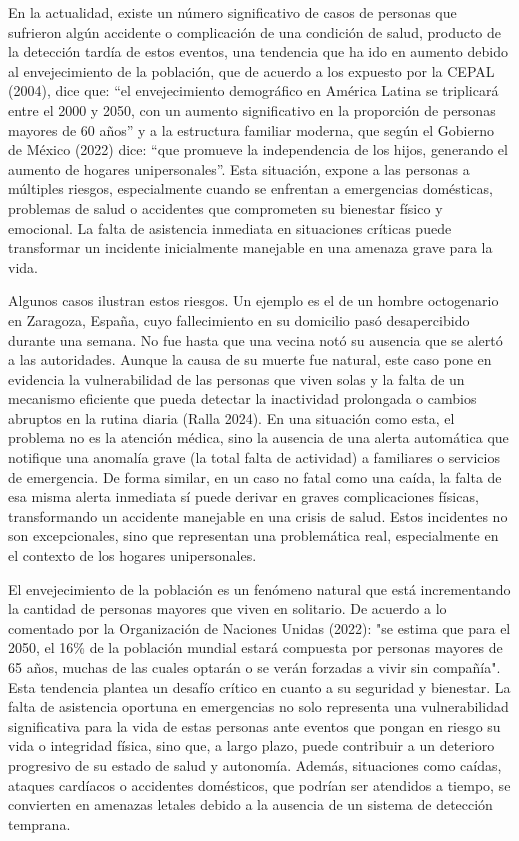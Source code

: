 
En la actualidad, existe un número significativo de casos de personas que sufrieron algún accidente o complicación de una condición de salud, producto de la detección tardía de estos eventos, una tendencia que ha ido en aumento debido al envejecimiento de la población, que de acuerdo a los expuesto por la CEPAL (2004), dice que: “el envejecimiento demográfico en América Latina se triplicará entre el 2000 y 2050, con un aumento significativo en la proporción de personas mayores de 60 años” y a la estructura familiar moderna, que según el Gobierno de México (2022) dice: “que promueve la independencia de los hijos, generando el aumento de hogares unipersonales”. Esta situación, expone a las personas a múltiples riesgos, especialmente cuando se enfrentan a emergencias domésticas, problemas de salud o accidentes que comprometen su bienestar físico y emocional. La falta de asistencia inmediata en situaciones críticas puede transformar un incidente inicialmente manejable en una amenaza grave para la vida.

Algunos casos ilustran estos riesgos. Un ejemplo es el de un hombre octogenario en Zaragoza, España, cuyo fallecimiento en su domicilio pasó desapercibido durante una semana. No fue hasta que una vecina notó su ausencia que se alertó a las autoridades. Aunque la causa de su muerte fue natural, este caso pone en evidencia la vulnerabilidad de las personas que viven solas y la falta de un mecanismo eficiente que pueda detectar la inactividad prolongada o cambios abruptos en la rutina diaria (Ralla 2024). En una situación como esta, el problema no es la atención médica, sino la ausencia de una alerta automática que notifique una anomalía grave (la total falta de actividad) a familiares o servicios de emergencia. De forma similar, en un caso no fatal como una caída, la falta de esa misma alerta inmediata sí puede derivar en graves complicaciones físicas, transformando un accidente manejable en una crisis de salud. Estos incidentes no son excepcionales, sino que representan una problemática real, especialmente en el contexto de los hogares unipersonales.

El envejecimiento de la población es un fenómeno natural que está incrementando la cantidad de personas mayores que viven en solitario. De acuerdo a lo comentado por la Organización de Naciones Unidas (2022): "se estima que para el 2050, el 16\% de la población mundial estará compuesta por personas mayores de 65 años, muchas de las cuales optarán o se verán forzadas a vivir sin compañía". Esta tendencia plantea un desafío crítico en cuanto a su seguridad y bienestar. La falta de asistencia oportuna en emergencias no solo representa una vulnerabilidad significativa para la vida de estas personas ante eventos que pongan en riesgo su vida o integridad física, sino que, a largo plazo, puede contribuir a un deterioro progresivo de su estado de salud y autonomía. Además, situaciones como caídas, ataques cardíacos o accidentes domésticos, que podrían ser atendidos a tiempo, se convierten en amenazas letales debido a la ausencia de un sistema de detección temprana.

